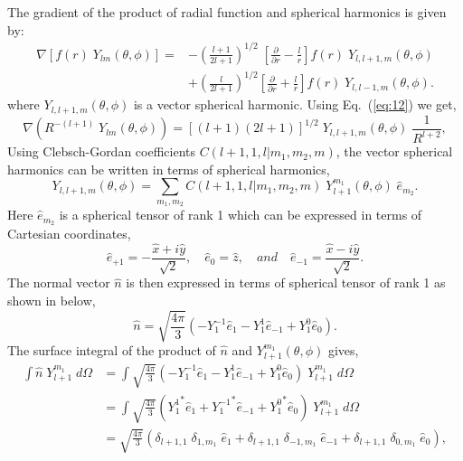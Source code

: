 The gradient of the product of radial function and spherical harmonics
is given by:\cite{Arfkan}
\begin{equation}
\begin{split}
{\nabla}\left[ f(r)\;Y_{lm}(\theta, \phi)\right] =& -\left(\frac{l+1}{2l+1}\right)^{1/2}\; \left[\frac{\partial}{\partial r}-\frac{l}{r} \right]f(r)\; Y_{l, l+1, m}(\theta, \phi)\\ &+ \left(\frac{l}{2l+1}\right)^{1/2}\left[\frac
{\partial}{\partial r}+\frac{l}{r} \right]f(r)\; Y_{l, l-1, m}(\theta, \phi).
\end{split}
\label{eq:12}
\end{equation}
where $Y_{l,l+1,m}(\theta, \phi)$ is a vector spherical
harmonic.\cite{Arfkan} Using Eq.~(\ref{eq:12}) we get,
\begin{equation}
{\nabla}\left({R^{-(l+1)}}\;Y_{lm}(\theta, \phi)\right) = [(l+1)(2l+1)]^{1/2}\; Y_{l,l+1,m}(\theta, \phi) \; \frac{1}{R^{l+2}},
\label{eq:13}
\end{equation}
Using Clebsch-Gordan coefficients $C(l+1,1,l|m_1,m_2,m)$, the vector
spherical harmonics can be written in terms of spherical harmonics,
\begin{equation}
Y_{l,l+1,m}(\theta, \phi) = \sum_{m_1, m_2} C(l+1,1,l|m_1,m_2,m)\; Y_{l+1}^{m_1}(\theta,\phi)\; \hat{e}_{m_2}.
\label{eq:14}
\end{equation}
Here $\hat{e}_{m_2}$ is a spherical tensor of rank 1 which can be expressed
in terms of Cartesian coordinates,
\begin{equation}
{\hat{e}}_{+1} = - \frac{\hat{x}+i\hat{y}}{\sqrt{2}},\quad {\hat{e}}_{0} = \hat{z},\quad and \quad {\hat{e}}_{-1} = \frac{\hat{x}-i\hat{y}}{\sqrt{2}}.
\label{eq:15}
\end{equation} 
The normal vector $\hat{n} $ is then expressed in terms of spherical tensor of rank 1 as shown in below,
\begin{equation}
\hat{n} = \sqrt{\frac{4\pi}{3}}\left(-Y_1^{-1}{\hat{e}}_1 - Y_1^{1}{\hat{e}}_{-1} + Y_1^{0}{\hat{e}}_0 \right).
\label{eq:16}
\end{equation}
The surface integral of the product of $\hat{n}$ and
$Y_{l+1}^{m_1}(\theta, \phi)$ gives,
\begin{equation}
\begin{split}
\int \hat{n}\;Y_{l+1}^{m_1}\;d\Omega &= \int \sqrt{\frac{4\pi}{3}}\left(-Y_1^{-1}{\hat{e}}_1 -Y_1^{1}{\hat{e}}_{-1} + Y_1^{0}{\hat{e}}_0 \right)\;Y_{l+1}^{m_1}\; d\Omega \\
&=  \int \sqrt{\frac{4\pi}{3}}\left({Y_1^{1}}^* {\hat{e}}_1 +{Y_1^{-1}}^* {\hat{e}}_{-1} + {Y_1^{0}}^* {\hat{e}}_0 \right)\;Y_{l+1}^{m_1}\; d\Omega \\
&=   \sqrt{\frac{4\pi}{3}}\left({\delta}_{l+1, 1}\;{\delta}_{1, m_1}\;{\hat{e}}_1 + {\delta}_{l+1, 1}\;{\delta}_{-1, m_1}\;{\hat{e}}_{-1}+ {\delta}_{l+1, 1}\;{\delta}_{0, m_1} \;{\hat{e}}_0\right),
\end{split}
\label{eq:17}
\end{equation}
